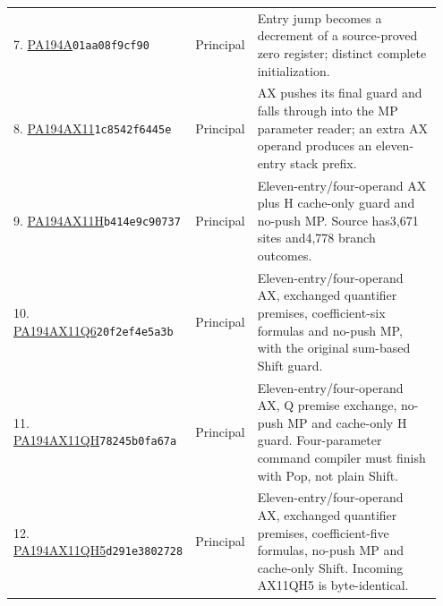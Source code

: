 \begin{longtable}{@{}p{0.27\linewidth}p{0.13\linewidth}p{0.55\linewidth}@{}}
7. \href{https://github.com/VladimirReshetnikov/ProveIt/blob/32d0d8b7d93a63ad4106c18cdb29b37927acdad2/Computability/BusyBeaver/Research/PA/docs/PA194R_research_2026-11-14/machines/PA194A/machine.tm}{PA194A}\newline\texttt{01aa08f9cf90} & Principal & Entry jump becomes a decrement of a source-proved zero register; distinct complete initialization.\\[5pt]
8. \href{https://github.com/VladimirReshetnikov/ProveIt/blob/32d0d8b7d93a63ad4106c18cdb29b37927acdad2/Computability/BusyBeaver/Research/PA/docs/pa194_ax11_research_2026-11-14/primary/machine/machine.tm}{PA194AX11}\newline\texttt{1c8542f6445e} & Principal & AX pushes its final guard and falls through into the MP parameter reader; an extra AX operand produces an eleven-entry stack prefix.\\[5pt]
9. \href{https://github.com/VladimirReshetnikov/ProveIt/blob/32d0d8b7d93a63ad4106c18cdb29b37927acdad2/docs/incoming/pa194_ax11h_research_2026-11-14.zip}{PA194AX11H}\newline\texttt{b414e9c90737} & Principal & Eleven-entry/four-operand AX plus H cache-only guard and no-push MP. Source has3,671 sites and4,778 branch outcomes.\\[5pt]
10. \href{https://github.com/VladimirReshetnikov/ProveIt/blob/32d0d8b7d93a63ad4106c18cdb29b37927acdad2/Computability/BusyBeaver/Research/PA/docs/pa194ax11q6_2026-11-14/candidate/machine/machine.tm}{PA194AX11Q6}\newline\texttt{20f2ef4e5a3b} & Principal & Eleven-entry/four-operand AX, exchanged quantifier premises, coefficient-six formulas and no-push MP, with the original sum-based Shift guard.\\[5pt]
11. \href{https://github.com/VladimirReshetnikov/ProveIt/blob/32d0d8b7d93a63ad4106c18cdb29b37927acdad2/docs/incoming/pa194_ax11qh_research_2026-11-14.zip}{PA194AX11QH}\newline\texttt{78245b0fa67a} & Principal & Eleven-entry/four-operand AX, Q premise exchange, no-push MP and cache-only H guard. Four-parameter command compiler must finish with Pop, not plain Shift.\\[5pt]
12. \href{https://github.com/VladimirReshetnikov/ProveIt/blob/32d0d8b7d93a63ad4106c18cdb29b37927acdad2/Computability/BusyBeaver/Research/PA/docs/pa194_ax11qh5_2026-11-14/machine/machine.tm}{PA194AX11QH5}\newline\texttt{d291e3802728} & Principal & Eleven-entry/four-operand AX, exchanged quantifier premises, coefficient-five formulas, no-push MP and cache-only Shift. Incoming AX11QH5 is byte-identical.\\[5pt]

\end{longtable}
